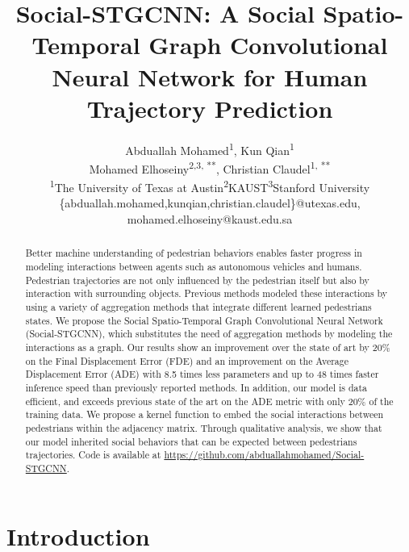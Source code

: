 \documentclass[10pt,twocolumn,letterpaper]{article}
\begin{document}
\title{Social-STGCNN: A Social Spatio-Temporal Graph Convolutional Neural Network for Human Trajectory Prediction}


\author
{
Abduallah Mohamed\textsuperscript{1}, Kun Qian\textsuperscript{1}\\ Mohamed Elhoseiny\textsuperscript{2,3, **}, Christian Claudel\textsuperscript{1, **}\\ \textsuperscript{1}The University of Texas at Austin\hfill\textsuperscript{2}KAUST\hfill\textsuperscript{3}Stanford University \\ \small\{abduallah.mohamed,kunqian,christian.claudel\}@utexas.edu,  mohamed.elhoseiny@kaust.edu.sa  
}


   


\maketitle
\thispagestyle{empty}

\begin{abstract}
Better machine understanding of pedestrian behaviors enables faster progress in modeling interactions between agents such as autonomous vehicles and humans. Pedestrian trajectories are not only influenced by the pedestrian itself but also by interaction with surrounding objects. Previous methods modeled these interactions by using a variety of aggregation methods that integrate different learned pedestrians states. We propose the Social Spatio-Temporal Graph Convolutional Neural Network (Social-STGCNN), which substitutes the need of aggregation methods by modeling the interactions as a graph. Our results show an improvement over the state of art by 20\% on the Final Displacement Error (FDE) and an improvement on the Average Displacement Error (ADE) with 8.5 times less parameters and up to 48 times faster inference speed than previously reported methods. In addition, our model is data efficient, and exceeds previous state of the art on the ADE metric with only 20\% of the training data. We propose a kernel function to embed the social interactions between pedestrians within the adjacency matrix. Through qualitative analysis, we show that our model inherited social behaviors that can be expected between pedestrians trajectories. Code is available at \url{https://github.com/abduallahmohamed/Social-STGCNN}.
\end{abstract}

\section{Introduction}
\end{document}
